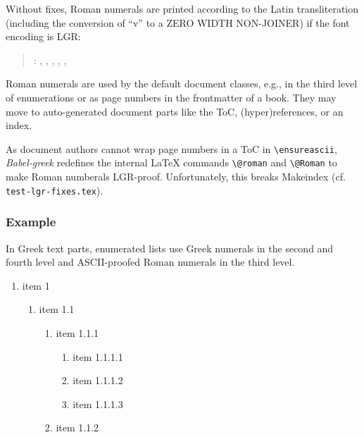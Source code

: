 \documentclass[a4paper]{article}
\newcommand{\file}{\texttt}
\begin{document}
  Without fixes, Roman numerals are printed according to the Latin
  transliteration (including the conversion of ``v'' to a
  ZERO WIDTH NON-JOINER) if the font encoding is LGR:

  \makeatletter
  \newcommand{\RomanNumeralTest}{\f@encoding:
              \romannumeral 1, \romannumeral 2, \romannumeral 3,
              \romannumeral 4, , }
  \makeatother
  \begin{quote}
    \RomanNumeralTest\\
    \lgrfont{\RomanNumeralTest}
  \end{quote}

  Roman numerals are used by the default document classes, e.g., in the third
  level of enumerations or as page numbers in the frontmatter of a book.
  They may move to auto-generated document parts like the ToC,
  (hyper)references, or an index.

  As document authors cannot wrap page numbers in a ToC in \verb|\ensureascii|,
  \emph{Babel-greek} redefines the internal LaTeX commands \verb|\@roman| and
  \verb|\@Roman| to make Roman numberals LGR-proof.
  Unfortunately, this breaks Makeindex (cf. \file{test-lgr-fixes.tex}).

\fi


\subsubsection{Example}

In Greek text parts, enumerated lists use Greek numerals in the second and
fourth level and ASCII-proofed Roman numerals in the third level.

\begin{enumerate}
  \item item 1
  \begin{enumerate}
    \item item 1.1
    \begin{enumerate}
      \item item 1.1.1
       \begin{enumerate}
         \item item 1.1.1.1
         \item item 1.1.1.2
         \item item 1.1.1.3 \label{item 1.1.1.3}
       \end{enumerate}
      \item item 1.1.2
    \end{enumerate}
  \end{enumerate}
\end{enumerate}
\end{document}
